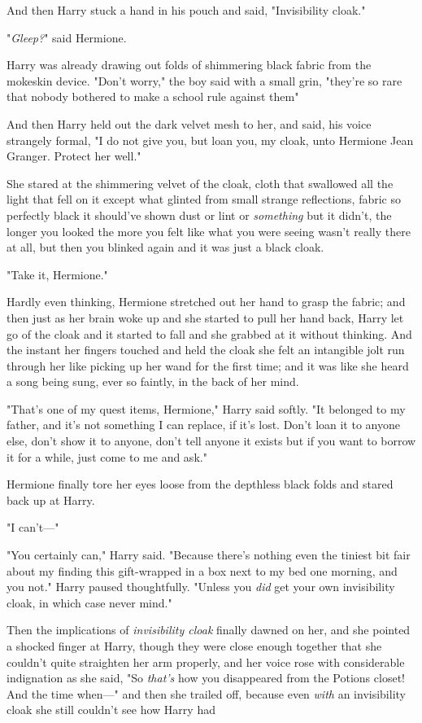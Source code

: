 And then Harry stuck a hand in his pouch and said, "Invisibility cloak."

"\emph{Gleep?}" said Hermione.

Harry was already drawing out folds of shimmering black fabric from the
mokeskin device. "Don't worry," the boy said with a small grin, "they're so
rare that nobody bothered to make a school rule against them{\el}"

And then Harry held out the dark velvet mesh to her, and said, his voice
strangely formal, "I do not give you, but loan you, my cloak, unto Hermione
Jean Granger. Protect her well."

She stared at the shimmering velvet of the cloak, cloth that swallowed all the
light that fell on it except what glinted from small strange reflections,
fabric so perfectly black it should've shown dust or lint or \emph{something}
but it didn't, the longer you looked the more you felt like what you were
seeing wasn't really there at all, but then you blinked again and it was just a
black cloak.

"Take it, Hermione."

Hardly even thinking, Hermione stretched out her hand to grasp the fabric; and
then just as her brain woke up and she started to pull her hand back, Harry let
go of the cloak and it started to fall and she grabbed at it without thinking.
And the instant her fingers touched and held the cloak she felt an intangible
jolt run through her like picking up her wand for the first time; and it was
like she heard a song being sung, ever so faintly, in the back of her mind.

"That's one of my quest items, Hermione," Harry said softly. "It belonged to my
father, and it's not something I can replace, if it's lost. Don't loan it to
anyone else, don't show it to anyone, don't tell anyone it exists{\el} but
if you want to borrow it for a while, just come to me and ask."

Hermione finally tore her eyes loose from the depthless black folds and stared
back up at Harry.

"I can't—"

"You certainly can," Harry said. "Because there's nothing even the tiniest bit
fair about my finding this gift-wrapped in a box next to my bed one morning,
and you{\el} not." Harry paused thoughtfully. "Unless you \emph{did} get
your own invisibility cloak, in which case never mind."

Then the implications of \emph{invisibility cloak} finally dawned on her, and
she pointed a shocked finger at Harry, though they were close enough together
that she couldn't quite straighten her arm properly, and her voice rose with
considerable indignation as she said, "So \emph{that's} how you disappeared
from the Potions closet! And the time when—" and then she trailed off,
because even \emph{with} an invisibility cloak she still couldn't see how Harry
had{\el}

